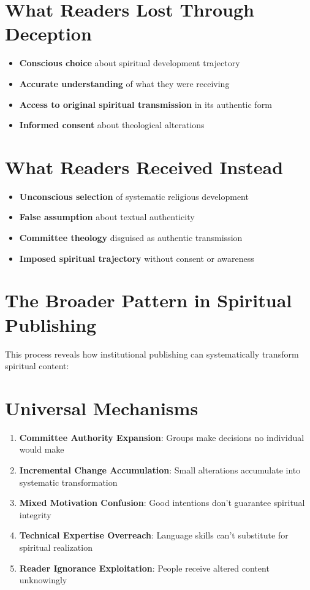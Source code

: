 \documentclass[11pt,twoside]{book}
\begin{document}
\section*{What Readers Lost Through Deception}
\label{sec:org598b5f2}
\begin{itemize}
\item \textbf{\textbf{Conscious choice}} about spiritual development trajectory
\item \textbf{\textbf{Accurate understanding}} of what they were receiving
\item \textbf{\textbf{Access to original spiritual transmission}} in its authentic form
\item \textbf{\textbf{Informed consent}} about theological alterations
\end{itemize}
\section*{What Readers Received Instead}
\label{sec:orgc97fef2}
\begin{itemize}
\item \textbf{\textbf{Unconscious selection}} of systematic religious development
\item \textbf{\textbf{False assumption}} about textual authenticity
\item \textbf{\textbf{Committee theology}} disguised as authentic transmission
\item \textbf{\textbf{Imposed spiritual trajectory}} without consent or awareness
\end{itemize}
\section*{The Broader Pattern in Spiritual Publishing}
\label{sec:org7a853a8}

This process reveals how institutional publishing can systematically transform spiritual content:
\section*{Universal Mechanisms}
\label{sec:org03dccd5}
\begin{enumerate}
\item \textbf{\textbf{Committee Authority Expansion}}: Groups make decisions no individual would make
\item \textbf{\textbf{Incremental Change Accumulation}}: Small alterations accumulate into systematic transformation
\item \textbf{\textbf{Mixed Motivation Confusion}}: Good intentions don't guarantee spiritual integrity
\item \textbf{\textbf{Technical Expertise Overreach}}: Language skills can't substitute for spiritual realization
\item \textbf{\textbf{Reader Ignorance Exploitation}}: People receive altered content unknowingly
\end{enumerate}
\end{document}
